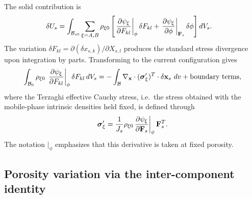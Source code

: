 The solid contribution is
\begin{align}
  \delta U_s &= \int_{\mathcal{B}_{s0}} \sum_{\xi=A,B} \rho_{\xi 0} \left[\left.\frac{\partial \psi_\xi}{\partial F_{kl}}\right\vert_\phi \delta F_{kl} + \left.\frac{\partial \psi_\xi}{\partial \phi}\right\vert_{\mathbf{F}_s} \delta\phi \right] dV_s.
  \label{eq:deltaU_solid}
\end{align}
The variation $\delta F_{kl} = \partial(\delta x_{s,k})/\partial X_{s,l}$ produces the standard stress divergence upon integration by parts.  Transforming to the current configuration gives
\begin{equation}
  \int_{\mathcal{B}_{0}} \rho_{\xi 0}\,\left.\frac{\partial \psi_\xi}{\partial F_{kl}}\right\vert_\phi \delta F_{kl}\, dV_s = -\int_{\mathcal{B}} \nabla_{\mathbf{x}} \cdot (\boldsymbol{\sigma}'_\xi)^T \cdot \delta\mathbf{x}_s \,\,dv + \text{boundary terms},
  \label{eq:stress_variation}
\end{equation}
where the Terzaghi effective Cauchy stress, i.e.\ the stress obtained with the
mobile-phase intrinsic densities held fixed, is defined through
\begin{equation}
  \boldsymbol{\sigma}'_\xi = \frac{1}{J_s} \rho_{\xi 0}\,\frac{\partial \psi_\xi}{\partial \mathbf{F}_s}\bigg\vert_\phi\, \mathbf{F}_s^T.
  \label{eq:var_cauchy_def}
\end{equation}
The notation $|_\phi$ emphasizes that this derivative is taken at fixed porosity.

\subsection{Porosity variation via the inter-component identity}

